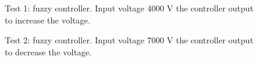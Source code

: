         \begin{multicols}{2}
            
            \begin{figure}[H]
                \centering
                \caption{Test 1: fuzzy controller. Input voltage 4000 V the controller output to increase the voltage.}
                \label{fig:fuzzy_test2}
            \end{figure}
            
            \begin{figure}[H]
                \centering
                \caption{Test 2: fuzzy controller. Input voltage 7000 V the controller output to decrease the voltage.}
                \label{fig:fuzzy_test1}
            \end{figure}
            
        \end{multicols}
        
